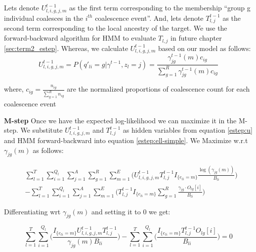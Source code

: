 Lets denote $U_{l,i,g,j,m}^{t-1}$ as the first term corresponding to the membership ``group g individual coalesces in the $i^{th}$ coalescence event''. And, lets denote $T_{l,j}^{t-1}$ as the second term corresponding to the local ancestry of the target. We use the forward-backward algorithm for HMM to evaluate $T_{l,j}$ in future chapter \ref{sec:term2_estep}. Whereas, we calculate $U_{l,i,g,j,m}^{t-1}$ based on our model as follows:
\begin{equation}
    U_{l,i,g,j,m}^{t-1} = P(q'_{li} = g | \gamma^{t-1}, z_l = j) = \frac{\gamma_{jg}^{t-1}(m)c_{ig}}{\sum_{g=1}^R \gamma_{jg}^{t-1}(m)c_{ig}}
    \label{estep:u}
\end{equation}

where, $c_{ig} = \frac{n_{ig}}{\sum_{g=1}^R n_{ig}}$ are the normalized proportions of coalescence count for each coalescence event

\textbf{M-step}
Once we have the expected log-likelihood we can maximize it in the M-step. We substitute $U_{l,i,g,j,m}^{t-1}$ and $T_{l,j}^{t-1}$ as hidden variables from equation \ref{estep:u} and HMM forward-backward into equation \ref{estep:ell-simple}. We Maximize w.r.t $\gamma_{jg}(m)$ as follows:

\begin{align}
    &\sum_{l = 1}^T \sum_{i = 1}^{Q_l} \sum_{j = 1}^A \sum_{g = 1}^R \sum_{m = 1}^E \Bigg( 
        U_{l,i,g,j,m}^{t-1} T_{l,j}^{t-1} I_{\{e_{l i} = m\}} \frac{\log(\gamma_{jg}(m))}{B_{li}} \Bigg) \nonumber \\
    &- \sum_{l = 1}^T \sum_{i = 1}^{Q_l} \sum_{j = 1}^A \sum_{m = 1}^E \Bigg( 
        T_{l,j}^{t-1} I_{\{e_{l i} = m\}} \sum_{g = 1}^R \frac{\gamma_{jg} \cdot O_{lg}[i]}{B_{li}} \Bigg)
\end{align}

Differentiating wrt $\gamma_{jg}(m)$ and setting it to 0 we get:

\begin{equation}
\sum_{l = 1}^T \sum_{i = 1}^{Q_l}  \Big( \frac{I_{\{e_{l i} = m\}}U_{l,i,g,j,m}^{t-1} T_{l,j}^{t-1}}{\gamma_{jg}(m)B_{li}} \Big) -  \sum_{l = 1}^T \sum_{i = 1}^{Q_l} \Big(\frac{I_{\{e_{l i} = m\}} T_{l,j}^{t-1}  O_{lg}[i]}{B_{li}} \Big) = 0
\end{equation} 


